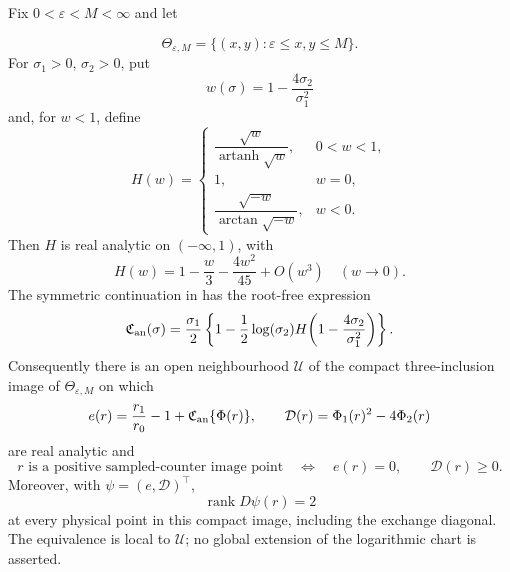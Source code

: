 \begin{proposition}
\label{prop:analytic-joint-image-chart-main}
Fix \(0<\varepsilon<M<\infty\) and let

\[
\Theta_{\varepsilon,M}
=\{(x,y):\varepsilon\le x,y\le M\}.
\]
For \(\sigma_1>0\), \(\sigma_2>0\), put
\[
w(\sigma)=1-\frac{4\sigma_2}{\sigma_1^2}
\]
and, for \(w<1\), define
\[
H(w)=
\begin{cases}
\dfrac{\sqrt w}{\operatorname{artanh}\sqrt w},&0<w<1,\\[5pt]
1,&w=0,\\[2pt]
\dfrac{\sqrt{-w}}{\arctan\sqrt{-w}},&w<0.
\end{cases}
\]
Then \(H\) is real analytic on \((-\infty,1)\), with
\[
H(w)=1-\frac w3-\frac{4w^2}{45}+O(w^3)
\quad(w\longrightarrow0).
\]
The symmetric continuation in
 has the root-free expression
\[
\mathfrak C_{\rm an}(\sigma)
=\frac{\sigma_1}{2}
\left\{1-\frac12\log(\sigma_2)
H\!\left(1-\frac{4\sigma_2}{\sigma_1^2}\right)\right\}.
\]
Consequently there is an open neighbourhood \(\mathcal U\) of the compact
three-inclusion image of \(\Theta_{\varepsilon,M}\) on which
\[
e(r)=\frac{r_1}{r_0}-1+\mathfrak C_{\rm an}\{\Phi(r)\},
\qquad
\mathcal D(r)=\Phi_1(r)^2-4\Phi_2(r)
\]
are real analytic and
\[
r\text{ is a positive sampled-counter image point}
\quad\Longleftrightarrow\quad
e(r)=0,\qquad \mathcal D(r)\ge0.
\]
Moreover, with \(\psi=(e,\mathcal D)^\top\),
\[
\operatorname{rank}D\psi(r)=2
\]
at every physical point in this compact image, including the exchange
diagonal.  The equivalence is local to \(\mathcal U\); no global extension
of the logarithmic chart is asserted.
\end{proposition}

